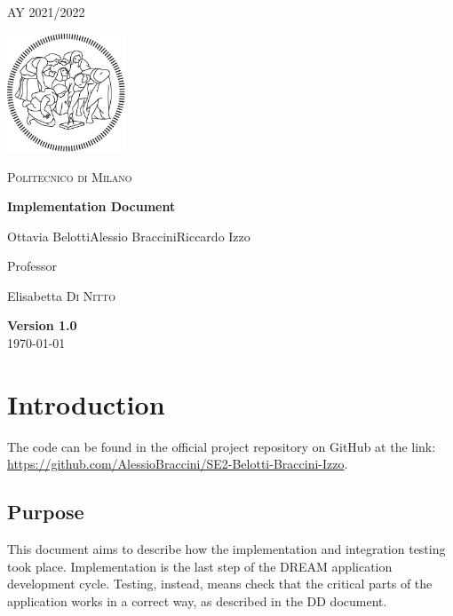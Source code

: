 \documentclass[table, 12pt]{article}
\begin{document}
\begin{titlepage}
    \centering
    {\scshape\large AY 2021/2022 \par}
    \vfill
    \includegraphics[width=100pt]{assets/logo-polimi-new.pdf}\par\vspace{1cm}
    {\scshape\LARGE Politecnico di Milano \par}
    \vspace{1.5cm}
    {\huge\bfseries Implementation Document \par}
    \vspace{2cm}
    {\Large {Ottavia Belotti\quad Alessio Braccini\quad Riccardo Izzo}\par}
    \vfill
    {\large Professor\par
        Elisabetta \textsc{Di Nitto}}
    \vfill
    {\large \textbf{Version 1.0}\\ \today \par}
\end{titlepage}


\thispagestyle{plain}
\mbox{}
\newpage
{}
\tableofcontents
\newpage
{}

\section{Introduction}
The code can be found in the official project repository on GitHub at the link: \url{https://github.com/AlessioBraccini/SE2-Belotti-Braccini-Izzo}.
\subsection{Purpose}

This document aims to describe how the implementation and integration
testing took place.
Implementation is the last step of the DREAM application
development cycle.
Testing, instead, means check that the critical parts of the application
works in a correct way, as described in the DD document.
\end{document}
